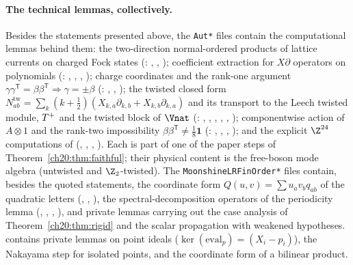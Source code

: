 \paragraph{The technical lemmas, collectively.}  Besides the statements presented above, the \texttt{Aut*} files contain the
computational lemmas behind them: the two-direction normal-ordered products of lattice currents on charged Fock states
(: , , ); coefficient
extraction for $X\partial$ operators on polynomials (: , ,
, ); charge coordinates and the rank-one argument $\gamma\gamma^{\mathsf T}=\beta\beta^{\mathsf T}
\Rightarrow\gamma=\pm\beta$ (: , ,
); the twisted closed form $N^{\mathrm{tw}}_{ab}=\sum_k(k+\tfrac12)(X_{k,a}\partial_{k,b}+X_{k,b}\partial_{k,a})$ and its
transport to the Leech twisted module, $T^{+}$ and the twisted block of $\Vnat$ (:
, , , , ,
); componentwise action of $A\otimes1$ and the rank-two impossibility
$\beta\beta^{\mathsf T}\ne\tfrac18\mathbf 1$ (: ,
, , ); and the explicit $\Z^{24}$ computations of
 (, , , ).
Each is part of one of the paper steps of Theorem~\ref{ch20:thm:faithful}; their physical content is the free-boson mode
algebra (untwisted and $\Z_2$-twisted).  The \texttt{MoonshineLRFinOrder*} files contain, besides the quoted statements, the
coordinate form $Q(u,v)=\sum u_av_bq_{ab}$ of the quadratic letters (, ,
), the spectral-decomposition operators of the periodicity lemma (,
, , ), and private lemmas carrying out the case analysis
of Theorem~\ref{ch20:thm:rigid} and the scalar propagation with weakened hypotheses.  
contains private lemmas on point ideals ($\ker(\mathrm{eval}_p)=(X_i-p_i)$), the Nakayama step for isolated points, and the
coordinate form of a bilinear product.

